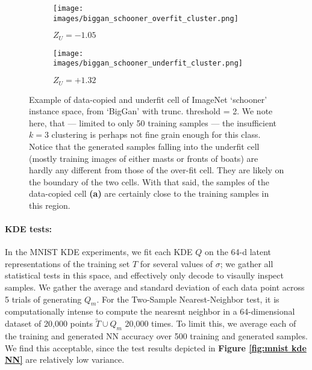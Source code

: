 \begin{figure*}[h]
    \centering
    \begin{subfigure}{0.49\linewidth}
        \centering
        \texttt{[image: images/biggan\_schooner\_overfit\_cluster.png]}
        \label{fig:biggan schooner overfit}
        \caption{$Z_U = -1.05$}
    \end{subfigure}
    \hfill
    \begin{subfigure}{0.49\linewidth}
        \centering
        \texttt{[image: images/biggan\_schooner\_underfit\_cluster.png]}
        \label{fig:biggan schooner underfit}
        \caption{$Z_U = +1.32$}
    \end{subfigure}
    \caption[Example of data-copied and underfit cell of ImageNet `schooner' instance space, from `BigGan' with trunc.]{Example of data-copied and underfit cell of ImageNet `schooner' instance space, from `BigGan' with trunc. threshold = 2. We note here, that --- limited to only 50 training samples --- the insufficient $k = 3$ clustering is perhaps not fine grain enough for this class. Notice that the generated samples falling into the underfit cell (mostly training images of either masts or fronts of boats) are hardly any different from those of the over-fit cell.  They are likely on the boundary of the two cells. With that said, the samples of the data-copied cell \textbf{(a)} are certainly close to the training samples in this region.}
    \label{fig:biggan schooner examples}
\end{figure*}

\paragraph{\textbf{KDE tests}:}
In the MNIST KDE experiments, we fit each KDE $Q$ on the 64-d latent representations of the training set $T$ for several values of $\sigma$; we gather all statistical tests in this space, and effectively only decode to visaully inspect samples. We gather the average and standard deviation of each data point across 5 trials of generating $Q_m$. For the Two-Sample Nearest-Neighbor test, it is computationally intense to compute the nearesnt neighbor in a 64-dimensional dataset of 20,000 points $\widetilde{T} \cup Q_m$ 20,000 times. To limit this, we average each of the training and generated NN accuracy over 500 training and generated samples. We find this acceptable, since the test results depicted in \textbf{Figure \ref{fig:mnist kde NN}} are relatively low variance. 

